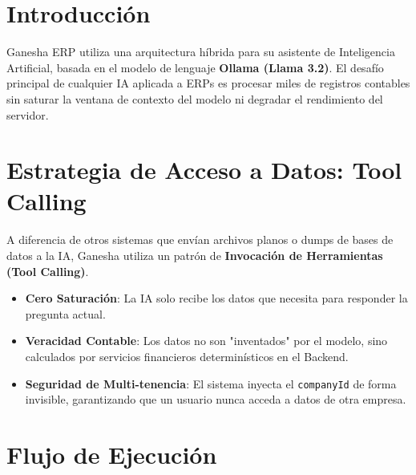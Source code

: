 \documentclass[12pt, a4paper, oneside]{book}
\begin{document}
\chapter{Introducción}
Ganesha ERP utiliza una arquitectura híbrida para su asistente de Inteligencia Artificial, basada en el modelo de lenguaje \textbf{Ollama (Llama 3.2)}. El desafío principal de cualquier IA aplicada a ERPs es procesar miles de registros contables sin saturar la ventana de contexto del modelo ni degradar el rendimiento del servidor.

\chapter{Estrategia de Acceso a Datos: Tool Calling}
A diferencia de otros sistemas que envían archivos planos o dumps de bases de datos a la IA, Ganesha utiliza un patrón de \textbf{Invocación de Herramientas (Tool Calling)}.

\begin{tcolorbox}[title=Ventajas del Modelo TAG (Tool-Augmented Generation), colback=blue!5, colframe=ganeshaaccent]
    \begin{itemize}
        \item \textbf{Cero Saturación}: La IA solo recibe los datos que necesita para responder la pregunta actual.
        \item \textbf{Veracidad Contable}: Los datos no son "inventados" por el modelo, sino calculados por servicios financieros determinísticos en el Backend.
        \item \textbf{Seguridad de Multi-tenencia}: El sistema inyecta el \texttt{companyId} de forma invisible, garantizando que un usuario nunca acceda a datos de otra empresa.
    \end{itemize}
\end{tcolorbox}

\chapter{Flujo de Ejecución}
\end{document}

